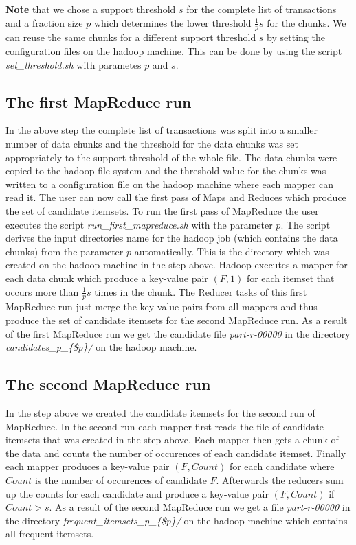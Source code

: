 \documentclass[a4paper,ngerman]{scrartcl}
\begin{document}
\textbf{Note} that we chose a support threshold $s$ for the complete list of transactions and a fraction size $p$ which determines the lower threshold $\frac{1}{p}s$ for the chunks. We can reuse the same chunks for a different support threshold $s$ by setting the configuration files on the hadoop machine. This can be done by using the script \textit{set\_threshold.sh} with parametes $p$ and $s$.
\subsection{The first MapReduce run}
In the above step the complete list of transactions was split into a smaller number of data chunks and the threshold for the data chunks was set appropriately to the support threshold of the whole file. The data chunks were copied to the hadoop file system and the threshold value for the chunks was written to a configuration file on the hadoop machine where each mapper can read it. The user can now call the first pass of Maps and Reduces which produce the set of candidate itemsets. To run the first pass of MapReduce the user executes the script \textit{run\_first\_mapreduce.sh} with the parameter $p$. The script derives the input directories name for the hadoop job (which contains the data chunks) from the parameter $p$ automatically. This is the directory which was created on the hadoop machine in the step above. Hadoop executes a mapper for each data chunk which produce a key-value pair $(F,1)$ for each itemset that occurs more than $\frac{1}{p}s$ times in the chunk. The Reducer tasks of this first MapReduce run just merge the key-value pairs from all mappers and thus produce the set of candidate itemsets for the second MapReduce run. As a result of the first MapReduce run we get the candidate file \textit{part-r-00000} in the directory \textit{candidates\_p\_\{\$p\}/} on the hadoop machine.

\subsection{The second MapReduce run}
In the step above we created the candidate itemsets for the second run of MapReduce. In the second run each mapper first reads the file of candidate itemsets that was created in the step above. Each mapper then gets a chunk of the data and counts the number of occurences of each candidate itemset. Finally each mapper produces a key-value pair $(F,Count)$ for each candidate where $Count$ is the number of occurences of candidate $F$. Afterwards the reducers sum up the counts for each candidate and produce a key-value pair $(F,Count)$ if $Count>s$. As a result of the second MapReduce run we get a file \textit{part-r-00000} in the directory \textit{frequent\_itemsets\_p\_\{\$p\}/} on the hadoop machine which contains all frequent itemsets. 
\end{document}
